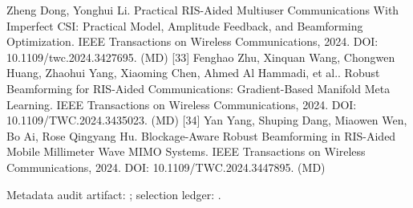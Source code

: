 \documentclass[10pt,twocolumn]{article}
\begin{document}
Zheng Dong, Yonghui Li. Practical RIS-Aided Multiuser Communications
With Imperfect CSI: Practical Model, Amplitude Feedback, and Beamforming
Optimization. IEEE Transactions on Wireless Communications, 2024. DOI:
10.1109/twc.2024.3427695. (MD) {[}33{]} Fenghao Zhu, Xinquan Wang,
Chongwen Huang, Zhaohui Yang, Xiaoming Chen, Ahmed Al Hammadi, et al..
Robust Beamforming for RIS-Aided Communications: Gradient-Based Manifold
Meta Learning. IEEE Transactions on Wireless Communications, 2024. DOI:
10.1109/TWC.2024.3435023. (MD) {[}34{]} Yan Yang, Shuping Dang, Miaowen
Wen, Bo Ai, Rose Qingyang Hu. Blockage-Aware Robust Beamforming in
RIS-Aided Mobile Millimeter Wave MIMO Systems. IEEE Transactions on
Wireless Communications, 2024. DOI: 10.1109/TWC.2024.3447895. (MD)

Metadata audit artifact:
; selection
ledger: .
\end{document}
